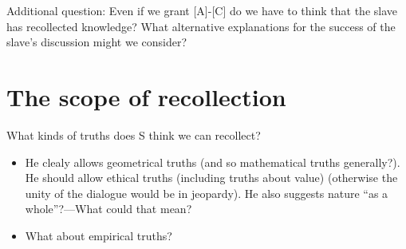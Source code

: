 \documentclass[11pt]{article}
\begin{document}
\noindent Additional question: Even if we grant [A]-[C] do we have to think that the slave has recollected knowledge? What alternative explanations for the success of the slave's discussion might we consider?

\section*{The scope of recollection}

\noindent What kinds of truths does S think we can recollect?

\begin{itemize}\item{He clealy allows geometrical truths (and so mathematical truths generally?). He should allow ethical truths (including truths about value) (otherwise the unity of the dialogue would be in jeopardy). He also suggests nature ``as a whole''?---What could that mean?}\item{What about empirical truths?}\end{itemize}
\end{document}
